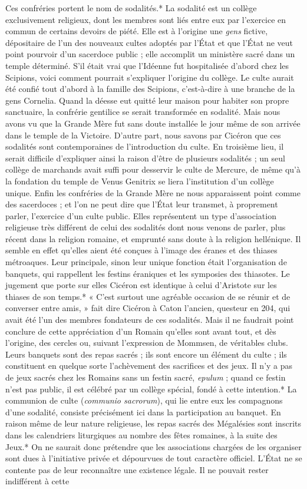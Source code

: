 \documentclass[a4paper, 11pt, oneside, polutonikogreek, french]{article}
\begin{document}
Ces confréries portent le nom de sodalités.* La sodalité est un collège exclusivement religieux, dont les membres sont liés entre eux par l'exercice en commun de certains devoirs de piété. Elle est à l'origine une \emph{gens} fictive, dépositaire de l'un des nouveaux cultes adoptés par l'État et que l'État ne veut point pourvoir d'un sacerdoce public ; elle accomplit un ministère sacré dans un temple déterminé. S'il était vrai que l'Idéenne fut hospitalisée d'abord chez les Scipions, voici comment pourrait s'expliquer l'origine du collège. Le culte aurait été confié tout d'abord à la famille des Scipions, c'est-à-dire à une branche de la gens Cornelia. Quand la déesse eut quitté leur maison pour habiter son propre sanctuaire, la confrérie gentilice se serait transformée en sodalité. Mais nous avons vu que la Grande Mère fut sans doute installée le jour même de son arrivée dans le temple de la Victoire. D'autre part, nous savons par Cicéron que ces sodalités sont contemporaines de l'introduction du culte. En troisième lieu, il serait difficile d'expliquer ainsi la raison d'être de plusieurs sodalités ; un seul collège de marchands avait suffi pour desservir le culte de Mercure, de même qu'à la fondation du temple de Venus Genitrix se liera l'institution d'un collège unique. Enfin les confréries de la Grande Mère ne nous apparaissent point comme des sacerdoces ; et l'on ne peut dire que l'État leur transmet, à proprement parler, l'exercice d'un culte public. Elles représentent un type d'association religieuse très différent de celui des sodalités dont nous venons de parler, plus récent dans la religion romaine, et emprunté sans doute à la religion hellénique. Il semble en effet qu'elles aient été conçues à l'image des éranes et des thiases métroaques. Leur principale, sinon leur unique fonction était l'organisation de banquets, qui rappellent les festins éraniques et les symposies des thiasotes. Le jugement que porte sur elles Cicéron est identique à celui d'Aristote sur les thiases de son temps.* « C'est surtout une agréable occasion de se réunir et de converser entre amis, » fait dire Cicéron à Caton l'ancien, questeur en 204, qui avait été l'un des membres fondateurs de ces sodalités. Mais il ne faudrait point conclure de cette appréciation d'un Romain qu'elles sont avant tout, et dès l'origine, des cercles ou, suivant l'expression de Mommsen, de véritables clubs. Leurs banquets sont des repas sacrés ; ils sont encore un élément du culte ; ils constituent en quelque sorte l'achèvement des sacrifices et des jeux. Il n'y a pas de jeux sacrés chez les Romains sans un festin sacré, \emph{epulum} ; quand ce festin n'est pas public, il est célébré par un collège spécial, fondé à cette intention.* La communion de culte (\emph{communio sacrorum}), qui lie entre eux les compagnons d'une sodalité, consiste précisément ici dans la participation au banquet. En raison même de leur nature religieuse, les repas sacrés des Mégalésies sont inscrits dans les calendriers liturgiques au nombre des fêtes romaines, à la suite des Jeux.* On ne saurait donc prétendre que les associations chargées de les organiser sont dues à l'initiative privée et dépourvues de tout caractère officiel. L'État ne se contente pas de leur reconnaître une existence légale. Il ne pouvait rester indifférent à cette 
\end{document}
